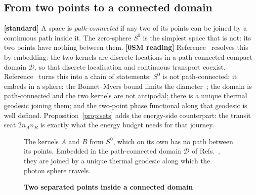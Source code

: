 \documentclass[%
 reprint, amsmath,amssymb, aps, prb, ]{revtex4-2}
\numberwithin{equation}{section}
\begin{document}
\subsection{From two points to a connected domain}

\textbf{[standard]} A space is \emph{path-connected} if any two of its points can be joined by a continuous path inside it. The zero-sphere $S^0$ is the simplest space that is not: its two points have nothing between them. \textbf{[0SM reading]} Reference~\cite{ref:p33} resolves this by embedding: the two kernels are discrete locations in a path-connected compact domain $\mathcal{D}$, so that discrete localisation and continuous transport coexist. Reference~\cite{ref:p51} turns this into a chain of statements: $S^0$ is not path-connected; it embeds in a sphere; the Bonnet--Myers bound limits the diameter~\cite{ref:myers}; the domain is path-connected and the two kernels are not antipodal; there is a unique thermal geodesic joining them; and the two-point phase functional along that geodesic is well defined. Proposition~\ref{prop:sets} adds the energy-side counterpart: the transit seat $2n_An_B$ is exactly what the energy budget needs for that journey.

\begin{figure}[t!]
\centering
{}
\caption{\textbf{Two separated points inside a connected domain}}
\label{fig:embed}
\vspace{0.4em}
\begin{minipage}{0.95\columnwidth}
\justifying\small
The kernels $A$ and $B$ form $S^0$, which on its own has no path between its points. Embedded in the path-connected domain $\mathcal{D}$ of Refs.~\cite{ref:p33,ref:p51}, they are joined by a unique thermal geodesic along which the photon sphere travels.
\end{minipage}
\end{figure}
\end{document}
